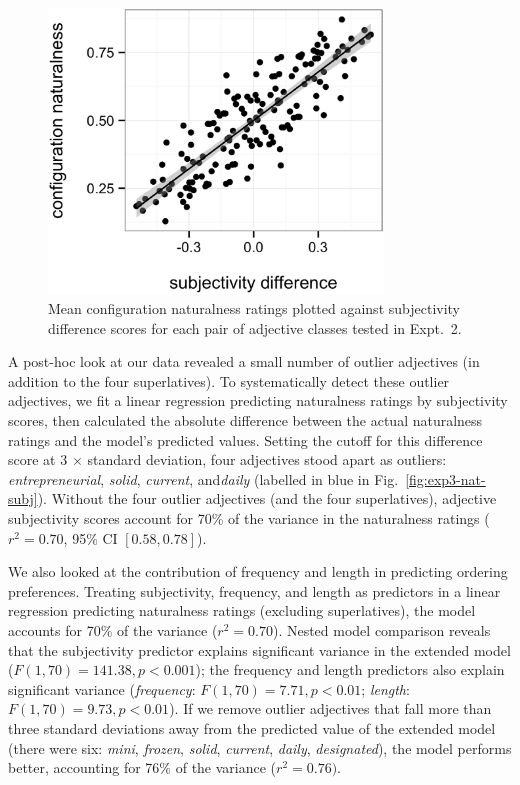 \documentclass[manuscript]{stjour}
\begin{document}
\begin{figure}
	\centering\includegraphics[width=3.5in]{plots/naturalness-subjectivity_class-difference_no-sup.eps}
	\caption{Mean configuration naturalness ratings plotted against subjectivity difference scores for each pair of adjective classes tested in Expt.~2. 
		}\label{fig:exp3-nat-subj-diff}
\end{figure}

A post-hoc look at our data revealed a small number of outlier adjectives (in addition to the four superlatives). To systematically detect these outlier adjectives, we fit a linear regression predicting naturalness ratings by subjectivity scores, then calculated the absolute difference between the actual naturalness ratings and the model's predicted values. Setting the cutoff for this difference score at 3 $\times$ standard deviation, four adjectives stood apart as outliers: ​\emph{entrepreneurial}, ​\emph{solid}, ​\emph{current}, and ​\emph{daily} (labelled in blue in Fig.~\ref{fig:exp3-nat-subj}). Without the four outlier adjectives (and the four superlatives), adjective subjectivity scores account for 70\% of the variance in the naturalness ratings ($r^2=0.70$, 95\% CI $[0.58,  0.78]$).

We also looked at the contribution of frequency and length in predicting ordering preferences. Treating subjectivity, frequency, and length as predictors in a linear regression predicting naturalness ratings (excluding superlatives), the model accounts for 70\% of the variance ($r^{2}=0.70$). {Nested model comparison reveals that the subjectivity predictor explains significant variance in the extended model ($F(1,70) = 141.38, p < 0.001$); the frequency and length predictors also explain significant variance (\emph{frequency}: $F(1,70) = 7.71, p < 0.01$; \emph{length}: $F(1,70) = 9.73, p < 0.01$).}
If we remove outlier adjectives that fall more than three standard deviations away from the predicted value of the extended model (there were six: \emph{mini}, \emph{frozen}, \emph{solid}, \emph{current}, \emph{daily}, \emph{designated}), the model performs better, accounting for 76\% of the variance ($r^{2}=0.76)$.
\end{document}
